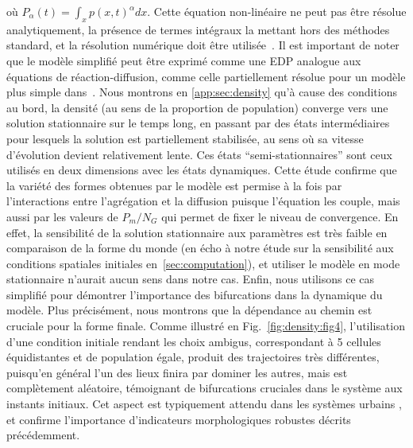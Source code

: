 {où $P_{\alpha}(t) = \int_x p(x,t)^{\alpha} dx$. Cette équation non-linéaire ne peut pas être résolue analytiquement, la présence de termes intégraux la mettant hors des méthodes standard, et la résolution numérique doit être utilisée~\cite{tadmor2012review}. Il est important de noter que le modèle simplifié peut être exprimé comme une EDP analogue aux équations de réaction-diffusion, comme celle partiellement résolue pour un modèle plus simple dans~\cite{bosch1990velocity}. Nous montrons en \ref{app:sec:density} qu'à cause des conditions au bord, la densité (au sens de la proportion de population) converge vers une solution stationnaire sur le temps long, en passant par des états intermédiaires pour lesquels la solution est partiellement stabilisée, au sens où sa vitesse d'évolution devient relativement lente. Ces états ``semi-stationnaires'' sont ceux utilisés en deux dimensions avec les états dynamiques. Cette étude confirme que la variété des formes obtenues par le modèle est permise à la fois par l'interactions entre l'agrégation et la diffusion puisque l'équation les couple, mais aussi par les valeurs de $P_m / N_G$ qui permet de fixer le niveau de convergence. En effet, la sensibilité de la solution stationnaire aux paramètres est très faible en comparaison de la forme du monde (en écho à notre étude sur la sensibilité aux conditions spatiales initiales en~\ref{sec:computation}), et utiliser le modèle en mode stationnaire n'aurait aucun sens dans notre cas. Enfin, nous utilisons ce cas simplifié pour démontrer l'importance des bifurcations dans la dynamique du modèle. Plus précisément, nous montrons que la dépendance au chemin est cruciale pour la forme finale. Comme illustré en Fig.~\ref{fig:density:fig4}, l'utilisation d'une condition initiale rendant les choix ambigus, correspondant à 5 cellules équidistantes et de population égale, produit des trajectoires très différentes, puisqu'en général l'un des lieux finira par dominer les autres, mais est complètement aléatoire, témoignant de bifurcations cruciales dans le système aux instants initiaux. Cet aspect est typiquement attendu dans les systèmes urbains , et confirme l'importance d'indicateurs morphologiques robustes décrits précédemment.
}


